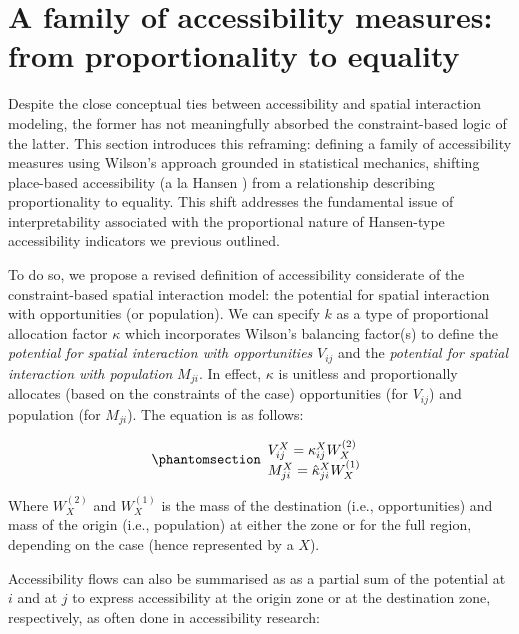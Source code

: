 \documentclass[
  10pt,
  letterpaper,
]{article}
\begin{document}
\section{A family of accessibility measures: from proportionality to
equality}\label{a-family-of-accessibility-measures-from-proportionality-to-equality}

Despite the close conceptual ties between accessibility and spatial
interaction modeling, the former has not meaningfully absorbed the
constraint-based logic of the latter. This section introduces this
reframing: defining a family of accessibility measures using Wilson's
approach grounded in statistical mechanics, shifting place-based
accessibility (a la Hansen \citep{hansen1959}) from a relationship
describing proportionality to equality. This shift addresses the
fundamental issue of interpretability associated with the proportional
nature of Hansen-type accessibility indicators we previous outlined.

To do so, we propose a revised definition of accessibility considerate
of the constraint-based spatial interaction model: the potential for
spatial interaction with opportunities (or population). We can specify
\(k\) as a type of proportional allocation factor \(\kappa\) which
incorporates Wilson's balancing factor(s) to define the \emph{potential
for spatial interaction with opportunities} \(V_{ij}\) and the
\emph{potential for spatial interaction with population} \(M_{ji}\). In
effect, \(\kappa\) is unitless and proportionally allocates (based on
the constraints of the case) opportunities (for \(V_{ij}\)) and
population (for \(M_{ji}\)). The equation is as follows:

\begin{equation}\phantomsection\label{eq-access-01}{
\begin{array}{l}
V_{ij}^X = \kappa_{ij}^X W_X^{(2)}\\ 
M_{ji}^X = \hat \kappa_{ji}^X W_X^{(1)}
\end{array}
}\end{equation}

\noindent Where \(W_X^{(2)}\) and \(W_X^{(1)}\) is the mass of the
destination (i.e., opportunities) and mass of the origin (i.e.,
population) at either the zone or for the full region, depending on the
case (hence represented by a \(X\)).

Accessibility flows can also be summarised as as a partial sum of the
potential at \(i\) and at \(j\) to express accessibility at the origin
zone or at the destination zone, respectively, as often done in
accessibility research:
\end{document}
